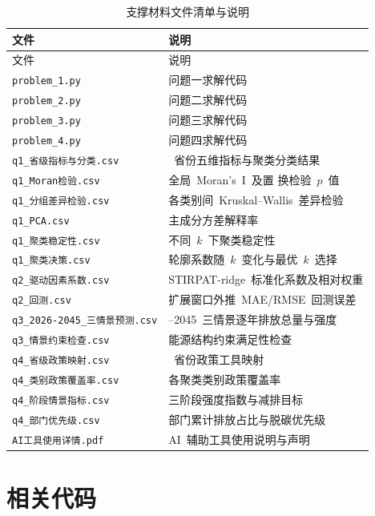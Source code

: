 \documentclass[12pt,a4paper]{ctexart}
\theoremstyle{definition}
\theoremstyle{plain}
\theoremstyle{remark}
\begin{document}
\begin{longtable}{>{\raggedright\arraybackslash}p{6.5cm}>{\raggedright\arraybackslash}p{7.8cm}}
\caption{支撑材料文件清单与说明}\label{tab:support}\\
\toprule
文件 & 说明 \\
\midrule
\endfirsthead
\toprule
文件 & 说明 \\
\midrule
\endhead
\bottomrule
\endlastfoot
\texttt{problem\_1.py} & 问题一求解代码 \\
\texttt{problem\_2.py} & 问题二求解代码 \\
\texttt{problem\_3.py} & 问题三求解代码 \\
\texttt{problem\_4.py} & 问题四求解代码 \\
\texttt{q1\_省级指标与分类.csv} & 30~省份五维指标与聚类分类结果 \\
\texttt{q1\_Moran检验.csv} & 全局~Moran's~I~及置 换检验~$p$~值 \\
\texttt{q1\_分组差异检验.csv} & 各类别间~Kruskal--Wallis~差异检验 \\
\texttt{q1\_PCA.csv} & 主成分方差解释率 \\
\texttt{q1\_聚类稳定性.csv} & 不同~$k$~下聚类稳定性 \\
\texttt{q1\_聚类决策.csv} & 轮廓系数随~$k$~变化与最优~$k$~选择 \\
\texttt{q2\_驱动因素系数.csv} & STIRPAT-ridge~标准化系数及相对权重 \\
\texttt{q2\_回测.csv} & 扩展窗口外推~MAE/RMSE~回测误差 \\
\texttt{q3\_2026-2045\_三情景预测.csv} & 2026--2045~三情景逐年排放总量与强度 \\
\texttt{q3\_情景约束检查.csv} & 能源结构约束满足性检查 \\
\texttt{q4\_省级政策映射.csv} & 30~省份政策工具映射 \\
\texttt{q4\_类别政策覆盖率.csv} & 各聚类类别政策覆盖率 \\
\texttt{q4\_阶段情景指标.csv} & 三阶段强度指数与减排目标 \\
\texttt{q4\_部门优先级.csv} & 部门累计排放占比与脱碳优先级 \\
\texttt{AI工具使用详情.pdf} & AI~辅助工具使用说明与声明 \\
\end{longtable}

\section{相关代码}
\end{document}
